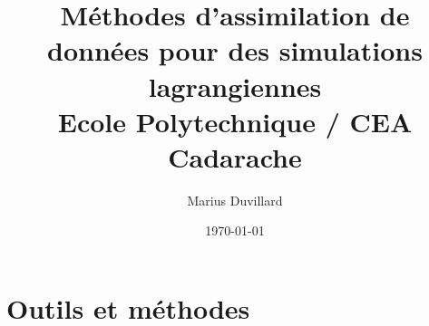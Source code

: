 \documentclass[a4paper]{report}
\title{
{Méthodes d'assimilation de données pour des simulations lagrangiennes}\\
{\large Ecole Polytechnique / CEA Cadarache}
}
\author{Marius Duvillard}
\date{\today}
\begin{document}
\maketitle
\tableofcontents





\chapter{Outils et méthodes}













% 
\end{document}
